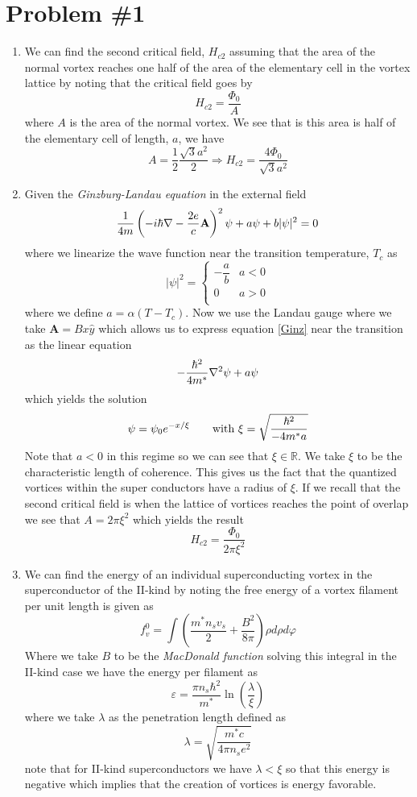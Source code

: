 \documentclass[11pt]{article}
\numberwithin{equation}{section}
\begin{document}


\section{Problem \#1}
\begin{enumerate}[(1)]
\item  We can find the second critical field, $H_{c2}$ assuming that the area of the 
normal vortex reaches one half of the area of the elementary cell in the vortex
lattice by noting that the critical field goes by
$$H_{c2} = \frac{\Phi_0}{A}$$
where $A$ is the area of the normal vortex. We see that is this area is half of
the elementary cell of length, $a$, we have
$$A = \frac{1}{2}\frac{\sqrt{3}a^2}{2} \Rightarrow H_{c2} = \frac{4\Phi_0}{\sqrt{3}a^2}$$

\item Given the \emph{Ginzburg-Landau equation} in the external field
\begin{equation}
\frac{1}{4m}\left(-i\hbar\bold\nabla-\frac{2e}{c}\mathbf{A}\right)^2\psi + a\psi + b|\psi|^2 = 0
\label{Ginz}
\end{equation}
where we linearize the wave function near the transition temperature, $T_c$ as
$$|\psi|^2 = \left\{\begin{array}{cc}
                 -\dfrac{a}{b}     &a<0\\
                 0                &a>0\\
             \end{array}\right.$$
where we define $a=\alpha(T-T_c)$. Now we use the Landau gauge where we take 
$\mathbf{A} = Bx\hat{y}$ which allows us to express equation \ref{Ginz} near the transition
as the linear equation
$$-\frac{\hbar^2}{4m^*}\bold\nabla^2\psi+a\psi$$
which yields the solution
$$\psi = \psi_0e^{-x/\xi}\qquad\textnormal{with\ }\xi=\sqrt{\frac{\hbar^2}{-4m^*a}}$$
Note that $a<0$ in this regime so we can see that $\xi\in\mathbb{R}$. We take $\xi$ to be
the characteristic length of coherence. This gives us the fact that the quantized vortices 
within the super conductors have a radius of $\xi$. If we recall that the second critical 
field is when the lattice of vortices reaches the point of overlap we see that $A=2\pi\xi^2$
which yields the result
$$H_{c2} = \frac{\Phi_0}{2\pi\xi^2}$$

\item We can find the energy of an individual superconducting vortex in the superconductor of
the II-kind by noting the free energy of a vortex filament per unit length is given as
$$f_{v}^{0} = \int\left(\frac{m^*n_sv_s}{2} + \frac{B^2}{8\pi}\right)\rho{d\rho}{d\varphi}$$
Where we take $B$ to be the \emph{MacDonald function} solving this integral in the II-kind
case we have the energy per filament as
$$\varepsilon = \frac{\pi{n_s}\hbar^2}{m^*}\ln\left(\frac{\lambda}{\xi}\right)$$
where we take $\lambda$ as the penetration length defined as
$$\lambda = \sqrt{\frac{m^*c}{4\pi{n_s}e^2}}$$
note that for II-kind superconductors we have $\lambda<\xi$ so that this energy is negative 
which implies that the creation of vortices is energy favorable.


\end{enumerate}
\end{document}
